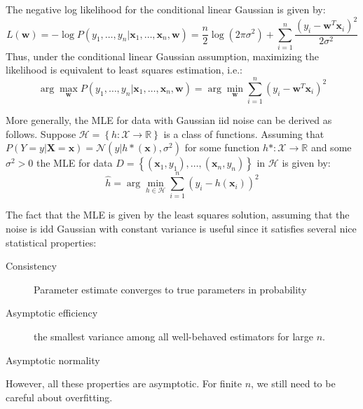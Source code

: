 \documentclass[a4paper,10pt,twoside]{article}
\begin{document}
The negative log likelihood for the conditional linear Gaussian is given by:
\begin{equation*}
    L(\mathbf{w})=-\log P(y_1,\ldots, y_n|\mathbf{x}_1,\ldots, \mathbf{x}_n,\mathbf{w}) = \frac{n}{2}\log(2\pi\sigma^2) + \sum_{i=1}^{n}\frac{(y_i-\mathbf{w}^T\mathbf{x}_i)^2}{2\sigma^2}
\end{equation*}
Thus, under the conditional linear Gaussian assumption, maximizing the likelihood is equivalent to least squares estimation, i.e.:
\begin{equation*}
    \arg\max_{\mathbf{w}}P(y_1, \ldots, y_n|\mathbf{x}_1, \ldots, \mathbf{x}_n, \mathbf{w})=\arg\min_{\mathbf{w}}\sum_{i=1}^{n}(y_i-\mathbf{w}^T\mathbf{x}_i)^2
\end{equation*}

More generally, the MLE for data with Gaussian iid noise can be derived as follows. Suppose $\mathcal{H}=\left\{h:\mathcal{X}\rightarrow\mathbb{R}\right\}$ is a class of functions. Assuming that $P(Y=y|\mathbf{X}=\mathbf{x})=\mathcal{N}(y|h*(\mathbf{x}),\sigma^2)$ for some function $h*:\mathcal{X}\rightarrow\mathbb{R}$ and some $\sigma^2>0$ the MLE for data $D=\left\{(\mathbf{x}_1, y_1), \ldots, (\mathbf{x}_n,y_n)\right\}$ in $\mathcal{H}$ is given by:
\begin{equation*}
    \hat{h}=\arg\min_{h\in\mathcal{H}}\sum_{i=1}^{n}(y_i-h(\mathbf{x}_i))^2
\end{equation*}

The fact that the MLE is given by the least squares solution, assuming that the noise is idd Gaussian with constant variance is useful since it satisfies several nice statistical properties:
\begin{description}
    \item[Consistency] Parameter estimate converges to true parameters in probability
    \item[Asymptotic efficiency] the smallest variance among all well-behaved estimators for large $n$.
    \item[Asymptotic normality]
\end{description}
However, all these properties are asymptotic. For finite $n$, we still need to be careful about overfitting.
\end{document}
